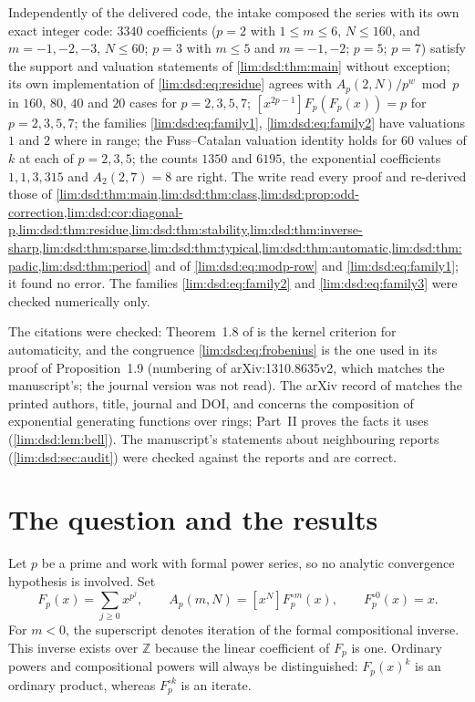 \documentclass[11pt]{article}
\theoremstyle{definition}
\theoremstyle{remark}
\newcommand{\Z}{\mathbb Z}
\begin{document}
Independently of the delivered code, the intake composed the series with
its own exact integer code: $3340$ coefficients ($p=2$ with $1\le m\le6$,
$N\le160$, and $m=-1,-2,-3$, $N\le60$; $p=3$ with $m\le5$ and $m=-1,-2$;
$p=5$; $p=7$) satisfy the support and valuation statements of
\cref{lim:dsd:thm:main} without exception; its own implementation of
\eqref{lim:dsd:eq:residue} agrees with $A_p(2,N)/p^{w}\bmod p$ in
$160$, $80$, $40$ and $20$ cases for $p=2,3,5,7$;
$[x^{2p-1}]F_p(F_p(x))=p$ for $p=2,3,5,7$; the families
\eqref{lim:dsd:eq:family1}, \eqref{lim:dsd:eq:family2} have valuations $1$
and $2$ where in range; the Fuss--Catalan valuation identity holds for
$60$ values of $k$ at each of $p=2,3,5$; the counts $1350$ and $6195$, the
exponential coefficients $1,1,3,315$ and $A_2(2,7)=8$ are right. The write
read every proof and re-derived those of
\cref{lim:dsd:thm:main,lim:dsd:thm:class,lim:dsd:prop:odd-correction,lim:dsd:cor:diagonal-p,lim:dsd:thm:residue,lim:dsd:thm:stability,lim:dsd:thm:inverse-sharp,lim:dsd:thm:sparse,lim:dsd:thm:typical,lim:dsd:thm:automatic,lim:dsd:thm:padic,lim:dsd:thm:period}
and of \eqref{lim:dsd:eq:modp-row} and \eqref{lim:dsd:eq:family1}; it
found no error. The families \eqref{lim:dsd:eq:family2} and
\eqref{lim:dsd:eq:family3} were checked numerically only.

The citations were checked: Theorem~1.8 of \cite{dsdRY} is the
kernel criterion for automaticity, and the congruence
\eqref{lim:dsd:eq:frobenius} is the one used in its proof of
Proposition~1.9 (numbering of arXiv:1310.8635v2, which matches the
manuscript's; the journal version was not read). The arXiv record of
\cite{dsdBCM} matches the printed authors, title, journal and DOI, and
concerns the composition of exponential generating functions over rings;
Part~II proves the facts it uses (\cref{lim:dsd:lem:bell}). The
manuscript's statements about neighbouring reports
(\cref{lim:dsd:sec:audit}) were checked against the reports and are
correct.

\section{The question and the results}
\label{lim:dsd:sec:introduction}

Let $p$ be a prime and work with formal power series, so no analytic
convergence hypothesis is involved. Set
\begin{equation}
 F_p(x)=\sum_{j\ge0}x^{p^j},\qquad
 A_p(m,N)=[x^N]F_p^{\circ m}(x),\qquad F_p^{\circ0}(x)=x.
 \label{lim:dsd:eq:definition}
\end{equation}
For $m<0$, the superscript denotes iteration of the formal compositional
inverse. This inverse exists over $\Z$ because the linear coefficient of
$F_p$ is one. Ordinary powers and compositional powers will always be
distinguished: $F_p(x)^k$ is an ordinary product, whereas $F_p^{\circ k}$
is an iterate.
\end{document}

